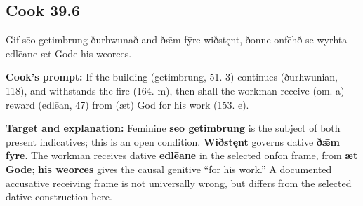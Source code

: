 \par\begin{minipage}{\linewidth}\raggedright
\subsection*{Cook 39.6}

Gif sēo getimbrung ðurhwunað and ðǣm fȳre wiðstęnt, ðonne onfēhð se wyrhta edlēane æt Gode his weorces.

\textbf{Cook's prompt:} If the building (getimbrung, 51. 3) continues (ðurhwunian, 118), and withstands the fire (164. m), then shall the workman receive (om. a) reward (edlēan, 47) from (æt) God for his work (153. e).

\textbf{Target and explanation:} Feminine \textbf{sēo getimbrung} is the subject of both present indicatives; this is an open condition. \textbf{Wiðstęnt} governs dative \textbf{ðǣm fȳre}. The workman receives dative \textbf{edlēane} in the selected onfōn frame, from \textbf{æt Gode}; \textbf{his weorces} gives the causal genitive “for his work.” A documented accusative receiving frame is not universally wrong, but differs from the selected dative construction here.

\end{minipage}\par\addvspace{4pt}

